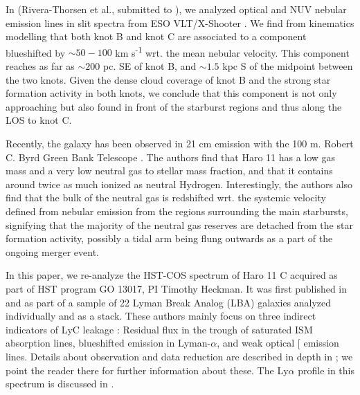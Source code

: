 \documentclass[twocolumn]{aastex61}
\begin{document}
In (Rivera-Thorsen et al., submitted to \apj), we analyzed optical and
NUV nebular emission lines in slit spectra from ESO VLT/X-Shooter
\citep[see also][]{Guseva2012}. We find from kinematics modelling that
both knot B and knot C are associated to a component blueshifted by
$\sim 50 - 100$ km s\textsuperscript{-1} wrt. the mean nebular velocity.
This component reaches as far as $\sim 200$ pc. SE of knot B, and
$\sim 1.5$ kpc S of the midpoint between the two knots. Given the dense
cloud coverage of knot B and the strong star formation activity in both
knots, we conclude that this component is not only approaching but also
found in front of the starburst regions and thus along the LOS to knot
C.

Recently, the galaxy has been observed in 21 cm  emission with
the 100 m. Robert C. Byrd Green Bank Telescope \citep{Pardy2016arXiv}.
The authors find that Haro 11 has a low gas mass and a very low neutral
gas to stellar mass fraction, and that it contains around twice as much
ionized as neutral Hydrogen. Interestingly, the authors also find that
the bulk of the neutral gas is redshifted wrt. the systemic velocity
defined from nebular emission from the  regions surrounding
the main starbursts, signifying that the majority of the neutral gas
reserves are detached from the star formation activity, possibly a tidal
arm being flung outwards as a part of the ongoing merger event.

In this paper, we re-analyze the HST-COS spectrum of Haro 11 C acquired
as part of HST program GO 13017, PI Timothy Heckman. It was first
published in \citet{Alexandroff2015} and \citet{Heckman2015} as part of
a sample of 22 Lyman Break Analog (LBA) galaxies analyzed individually
and as a stack. These authors mainly focus on three indirect indicators
of LyC leakage \citep{Overzier2009, Heckman2011}: Residual flux in the
trough of saturated ISM absorption lines, blueshifted emission in
Lyman-$\alpha$, and weak optical {[}\ion{S}{2}{]} emission lines.
Details about observation and data reduction are described in depth in
\citet{Alexandroff2015}; we point the reader there for further
information about these. The Ly$\alpha$ profile in this spectrum is
discussed in \citet{Verhamme2015}.
\end{document}
